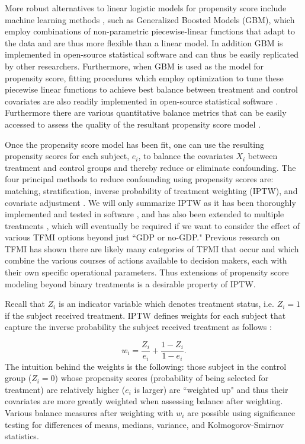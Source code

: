 \documentclass[conference]{IEEEtran}
\begin{document}
More robust alternatives to linear logistic models for propensity score include machine learning methods \cite{lee2010improving}, such as Generalized Boosted Models (GBM), which employ combinations of non-parametric piecewise-linear functions that adapt to the data and are thus more flexible than a linear model.  In addition GBM is implemented in open-source statistical software \cite{ridgeway2006gbm} and can thus be easily replicated by other researchers.  Furthermore, when GBM is used as the model for propensity score, fitting procedures which employ optimization to tune these piecewise linear functions to achieve best balance between treatment and control covariates are also readily implemented in open-source statistical software \cite{ridgeway2015toolkit}.  Furthermore there are various quantitative balance metrics that can be easily accessed to assess the quality of the resultant propensity score model \cite{ridgeway2015toolkit}. 

Once the propensity score model has been fit, one can use the resulting propensity scores for each subject, $e_i$, to balance the covariates $X_i$ between treatment and control groups and thereby reduce or eliminate confounding.  The four principal methods to reduce confounding using propensity scores are: matching, stratification, inverse probability of treatment weighting (IPTW), and covariate adjustment \cite{austin2011introduction}.  We will only summarize IPTW as it has been thoroughly implemented and tested in software \cite{ridgeway2015toolkit}, and has also been extended to multiple treatments \cite{mccaffrey2013tutorial}, which will eventually be required if we want to consider the effect of various TFMI options beyond just ``GDP or no-GDP."  Previous research on TFMI \cite{tfmiCluster} has shown there are likely many categories of TFMI that occur and which combine the various courses of actions available to decision makers, each with their own specific operational parameters. Thus extensions of propensity score modeling beyond binary treatments is a desirable property of IPTW.

Recall that $Z_i$ is an indicator variable which denotes treatment status, i.e. $Z_i=1$ if the subject received treatment.  IPTW defines weights for each subject that capture the inverse probability the subject received treatment as follows \cite{austin2011introduction}:

\begin{equation}
w_i = \frac{Z_i}{e_i} + \frac{1-Z_i}{1-e_i}.
\end{equation}
The intuition behind the weights is the following: those subject in the control group ($Z_i=0$) whose propensity scores (probability of being selected for treatment) are relatively higher ($e_i$ is  larger) are ``weighted up" and thus their covariates are more greatly weighted when assessing balance after weighting.  Various balance measures after weighting with $w_i$ are possible using significance testing for differences of means, medians, variance, and Kolmogorov-Smirnov statistics\cite{ridgeway2015toolkit}.   
\end{document}
